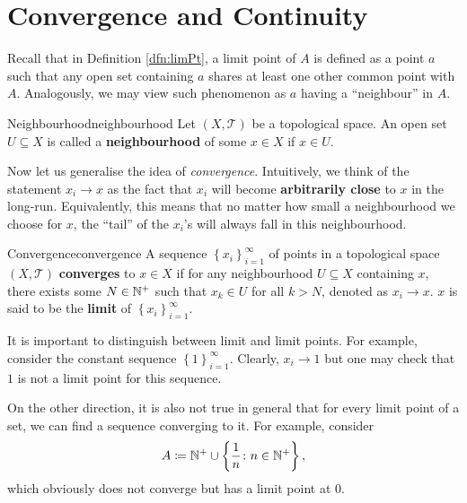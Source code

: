 \documentclass[math]{amznotes}
\theoremstyle{remark}
\begin{document}
\section{Convergence and Continuity}
Recall that in Definition \ref{dfn:limPt}, a limit point of $A$ is defined as a point $a$ such that any open set containing $a$ shares at least one other common point with $A$. Analogously, we may view such phenomenon as $a$ having a ``neighbour'' in $A$. 
\begin{dfnbox}{Neighbourhood}{neighbourhood}
    Let $\left(X, \mathcal{T}\right)$ be a topological space. An open set $U \subseteq X$ is called a {\color{red} \textbf{neighbourhood}} of some $x \in X$ if $x \in U$.
\end{dfnbox}
Now let us generalise the idea of \textit{convergence}. Intuitively, we think of the statement $x_i \to x$ as the fact that $x_i$ will become \textbf{arbitrarily close} to $x$ in the long-run. Equivalently, this means that no matter how small a neighbourhood we choose for $x$, the ``tail'' of the $x_i$'s will always fall in this neighbourhood.
\begin{dfnbox}{Convergence}{convergence}
    A sequence $\left\{x_i\right\}_{i = 1}^{\infty}$ of points in a topological space $\left(X, \mathcal{T}\right)$ {\color{red} \textbf{converges}} to $x \in X$ if for any neighbourhood $U \subseteq X$ containing $x$, there exists some $N \in \mathbb{N}^+$ such that $x_k \in U$ for all $k > N$, denoted as $x_i \to x$. $x$ is said to be the {\color{red} \textbf{limit}} of $\left\{x_i\right\}_{i = 1}^{\infty}$.
\end{dfnbox}
It is important to distinguish between limit and limit points. For example, consider the constant sequence $\left\{1\right\}_{i = 1}^{\infty}$. Clearly, $x_i \to 1$ but one may check that $1$ is not a limit point for this sequence.

On the other direction, it is also not true in general that for every limit point of a set, we can find a sequence converging to it. For example, consider 
\begin{equation*}
    A \coloneqq \mathbb{N}^+ \cup \left\{\frac{1}{n} \colon n \in \mathbb{N}^+\right\},
\end{equation*}
which obviously does not converge but has a limit point at $0$.
\end{document}
